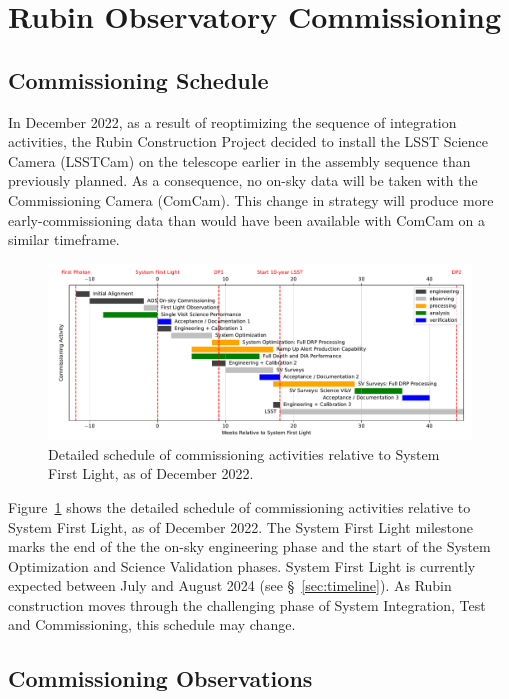\section{Rubin Observatory Commissioning}
\label{sec:commissioning}

\subsection{Commissioning Schedule}
\label{ssec:commissioning-schedule}

In December 2022, as a result of reoptimizing the sequence of integration activities, the Rubin Construction Project decided to install the LSST Science Camera (LSSTCam) on the telescope earlier in the assembly sequence than previously planned. 
As a consequence, no on-sky data will be taken with the Commissioning Camera (ComCam). 
This change in strategy will produce more early-commissioning data than would have been available with ComCam on a similar timeframe. 

\begin{figure}[htb]
\centering
\includegraphics[width=0.95\linewidth]{figures/rubinobs_on-sky_commissioning_gantt.pdf}
\caption{Detailed schedule of commissioning activities relative to System First Light, as of December 2022.}
\label{fig:commissioning-gantt}
\end{figure}

Figure~\ref{fig:commissioning-gantt} shows the detailed schedule of commissioning activities relative to System First Light, as of December 2022.  
The System First Light milestone marks the end of the the on-sky engineering phase and the start of the System Optimization and Science Validation phases. 
System First Light is currently expected between July and August 2024 (see \S~\ref{sec:timeline}).
As Rubin construction moves through the challenging phase of System Integration, Test and Commissioning, this schedule may change.

\subsection{Commissioning Observations}
\label{ssec:commissioning-observations}

